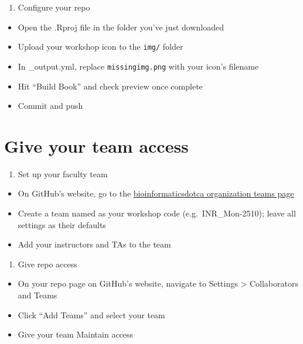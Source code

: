 \documentclass[
]{book}
\providecommand{\tightlist}{%
  \setlength{\itemsep}{0pt}\setlength{\parskip}{0pt}}
\begin{document}
\begin{enumerate}
\def\labelenumi{\arabic{enumi}.}
\setcounter{enumi}{5}
\tightlist
\item
  Configure your repo
\end{enumerate}

\begin{itemize}
\tightlist
\item
  Open the .Rproj file in the folder you've just downloaded
\item
  Upload your workshop icon to the \texttt{img/} folder
\item
  In \_output.yml, replace \texttt{missingimg.png} with your icon's filename
\item
  Hit ``Build Book'' and check preview once complete
\item
  Commit and push
\end{itemize}

\section{Give your team access}\label{give-your-team-access}

\begin{enumerate}
\def\labelenumi{\arabic{enumi}.}
\tightlist
\item
  Set up your faculty team
\end{enumerate}

\begin{itemize}
\tightlist
\item
  On GitHub's website, go to the \href{https://github.com/orgs/bioinformaticsdotca/teams}{bioinformaticsdotca organization teams page}
\item
  Create a team named as your workshop code (e.g.~INR\_Mon-2510); leave all settings as their defaults
\item
  Add your instructors and TAs to the team
\end{itemize}

\begin{enumerate}
\def\labelenumi{\arabic{enumi}.}
\setcounter{enumi}{1}
\tightlist
\item
  Give repo access
\end{enumerate}

\begin{itemize}
\tightlist
\item
  On your repo page on GitHub's website, navigate to Settings \textgreater{} Collaborators and Teams
\item
  Click ``Add Teams'' and select your team
\item
  Give your team Maintain access
\end{itemize}
\end{document}

